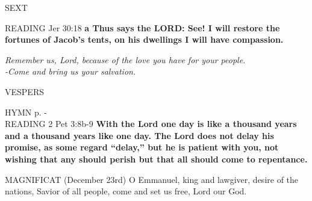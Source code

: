 \begin{flushleft}\normalsize{\uppercase{Sext\\}}\end{flushleft}
\noindent\small{\uppercase{Reading}} Jer 30:18 \textbf{a Thus says the LORD: See! I will restore the fortunes of Jacob’s tents, on his dwellings I will have compassion.\\}
\begin{center}\textit{Remember us, Lord, because of the love you have for your people.\\
-Come and bring us your salvation.}\end{center}

\begin{flushleft}\normalsize{\uppercase{Vespers\\}}\end{flushleft}
\small{\uppercase{Hymn} p. \pageref{advent:firstHymn}-\pageref{advent:lastHymn}\\}
\noindent\small{\uppercase{Reading}} 2 Pet 3:8b-9 \textbf{ With the Lord one day is like a thousand years and a thousand years like one day. The Lord does not delay his promise, as some regard “delay,” but he is patient with you, not wishing that any should perish but that all should come to repentance.\\}

\noindent\small{\uppercase{Magnificat}} (December 23rd)
O Emmanuel, king and lawgiver, desire of the nations, Savior of all people, come and set us free, Lord our God.
